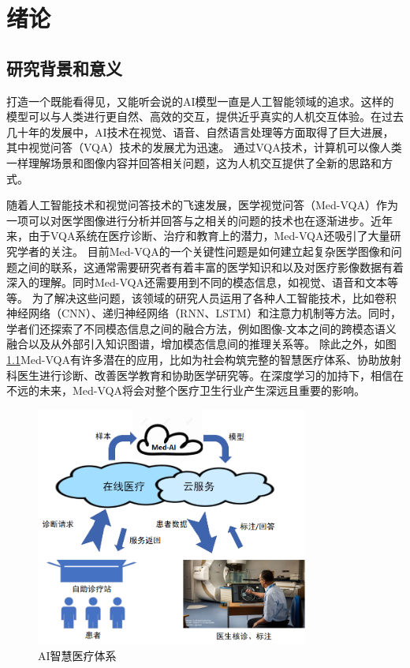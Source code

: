 \chapter{绪论}
%
\section{研究背景和意义}
打造一个既能看得见，又能听会说的AI模型一直是人工智能领域的追求。这样的模型可以与人类进行更自然、高效的交互，提供近乎真实的人机交互体验。在过去几十年的发展中，AI技术在视觉、语音、自然语言处理等方面取得了巨大进展，其中视觉问答（VQA）技术的发展尤为迅速。
通过VQA技术\cite{yu2015visual}，计算机可以像人类一样理解场景和图像内容并回答相关问题\cite{wu2017visual}，这为人机交互提供了全新的思路和方式。

随着人工智能技术和视觉问答技术的飞速发展，医学视觉问答（Med-VQA）作为一项可以对医学图像进行分析并回答与之相关的问题的技术也在逐渐进步。近年来，由于VQA系统在医疗诊断、治疗和教育上的潜力，Med-VQA还吸引了大量研究学者的关注\cite{wu2022medical}。
目前Med-VQA的一个关键性问题是如何建立起复杂医学图像和问题之间的联系，这通常需要研究者有着丰富的医学知识和以及对医疗影像数据有着深入的理解。同时Med-VQA还需要用到不同的模态信息，如视觉、语音和文本等等。
为了解决这些问题，该领域的研究人员运用了各种人工智能技术，比如卷积神经网络（CNN）、递归神经网络（RNN、LSTM）和注意力机制等方法\cite{teney2017visual}。同时，学者们还探索了不同模态信息之间的融合方法\cite{lin2021medical}，例如图像-文本之间的跨模态语义融合以及从外部引入知识图谱，增加模态信息间的推理关系等。
除此之外，如图\ref{sys_medaicloud}Med-VQA有许多潜在的应用，比如为社会构筑完整的智慧医疗体系、协助放射科医生进行诊断、改善医学教育和协助医学研究等。在深度学习的加持下，相信在不远的未来，Med-VQA将会对整个医疗卫生行业产生深远且重要的影响。
\begin{figure}[htbp]
	\centering	
	\includegraphics[width=0.8\textwidth]{Fig/myfig/chapter1/sys_medaicloud.png}  %
	\caption{\label{sys_medaicloud}AI智慧医疗体系} 
\end{figure}

